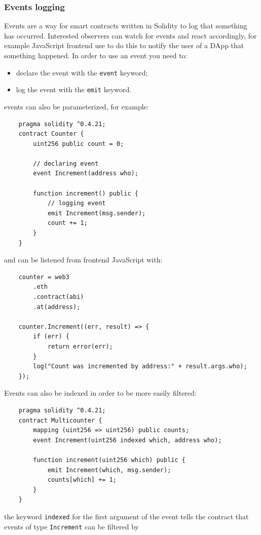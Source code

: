 \subsubsection{Events logging}
Events are a way for smart contracts written in Solidity to log that something has occurred.
Interested observers can watch for events and react accordingly, for example JavaScript frontend use to do this to notify the user of a DApp that something happened.
In order to use an event you need to:
\begin{itemize}
    \item declare the event with the \verb|event| keyword;
    \item log the event with the \verb|emit| keyword.
\end{itemize}
events can also be parameterized, for example:
\begin{verbatim}
    pragma solidity ^0.4.21;
    contract Counter {
        uint256 public count = 0;

        // declaring event
        event Increment(address who);
        
        function increment() public {
            // logging event
            emit Increment(msg.sender);
            count += 1;
        }
    }
\end{verbatim}
and can be listened from frontend JavaScript with:
\begin{verbatim}
    counter = web3
        .eth
        .contract(abi)
        .at(address);

    counter.Increment((err, result) => {
        if (err) {
            return error(err);
        }
        log("Count was incremented by address:" + result.args.who);
    });
\end{verbatim}

Events can also be indexed in order to be more easily filtered:
\begin{verbatim}
    pragma solidity ^0.4.21;
    contract Multicounter {
        mapping (uint256 => uint256) public counts;
        event Increment(uint256 indexed which, address who);

        function increment(uint256 which) public {
            emit Increment(which, msg.sender);
            counts[which] += 1;
        }
    }
\end{verbatim}
the keyword \verb|indexed| for the first argument of the event tells the contract that events of type \verb|Increment| can be filtered by \verb||


